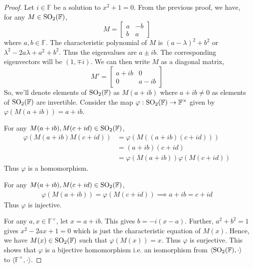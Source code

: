 \begin{proof}
    Let $i\in\mathbb{F}$ be a solution to $x^2+1=0$. From the previous proof, we
    have, for any $M\in\mathrm{SO}_{2}(\mathbb{F})$,
    \[ M=\begin{bmatrix}a & -b \\ b & a\end{bmatrix} \]
    where $a,b\in\mathbb{F}$. The characteristic polynomial of $M$ is
    $(a-\lambda)^2+b^2$ or $\lambda^2 - 2 a \lambda + a^2 + b^2$. Thus the
    eigenvalues are $a \pm ib$. The corresponding eigenvectors will be
    $(1,\mp i)$. We can then write $M$ as a diagonal matrix,
    \[ M'=\begin{bmatrix}a+ib & 0 \\ 0 & a-ib\end{bmatrix} \]
    So, we'll denote elements of $\mathrm{SO}_{2}(\mathbb{F})$ as $M(a+ib)$ where $a+ib \neq 0$ as
    elements of $\mathrm{SO}_{2}(\mathbb{F})$ are invertible. Consider the map
    $\varphi : \mathrm{SO}_{2}(\mathbb{F}) \to \mathbb{F}^\times$ given by $\varphi(M(a+ib))=a+ib$.
    \vspace{1ex}

    \noindent
    For any $M(a+ib),M(c+id)\in\mathrm{SO}_{2}(\mathbb{F})$,
    \begin{align*}
        \varphi(M(a+ib)M(c+id)) &= \varphi(M((a+ib)(c+id))) \\
                                &= (a+ib)(c+id) \\
                                &= \varphi(M(a+ib))\varphi(M(c+id))
    \end{align*}
    Thus $\varphi$ is a homomorphism.
    \vspace{1ex}

    \noindent
    For any $M(a+ib),M(c+id)\in\mathrm{SO}_{2}(\mathbb{F})$,
    \begin{align*}
        \varphi(M(a+ib)) = \varphi(M(c+id)) \implies a+ib = c+id
    \end{align*}
    Thus $\varphi$ is injective.
    \vspace{1ex}

    \noindent
    For any $a,x\in\mathbb{F}^\times$, let $x=a+ib$. This gives $b=-i(x-a)$.
    Further, $a^2+b^2=1$ gives $x^2 - 2ax + 1 = 0$ which is just the
    characteristic equation of $M(x)$. Hence, we have $M(x)\in\mathrm{SO}_{2}(\mathbb{F})$ such that
    $\varphi(M(x))=x$. Thus $\varphi$ is surjective. This shows that $\varphi$ is
    a bijective homomorphism i.e. an isomorphism from 
    $\langle\mathrm{SO}_{2}(\mathbb{F}),\cdot\rangle$ to $\langle\mathbb{F}^\times,\cdot\rangle$.
\end{proof}

